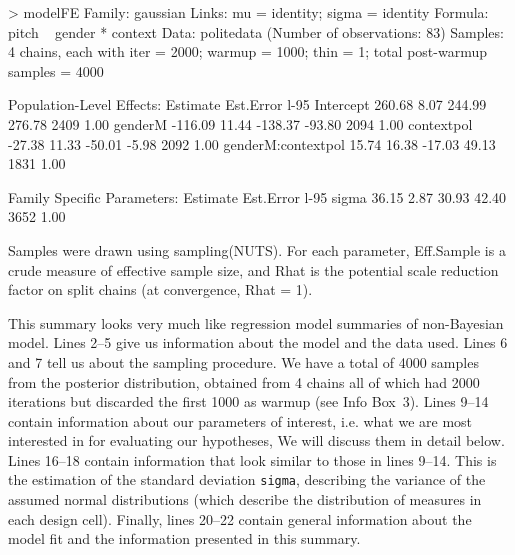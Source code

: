 \documentclass[nobib]{tufte-handout}
\begin{document}
\medskip

\begin{minipage}[]{1.2\textwidth}
\begin{rc}
> modelFE
 Family: gaussian 
  Links: mu = identity; sigma = identity 
Formula: pitch ~ gender * context 
   Data: politedata (Number of observations: 83) 
Samples: 4 chains, each with iter = 2000; warmup = 1000; thin = 1;
         total post-warmup samples = 4000

Population-Level Effects: 
                   Estimate Est.Error l-95%
Intercept            260.68      8.07   244.99   276.78       2409 1.00
genderM             -116.09     11.44  -138.37   -93.80       2094 1.00
contextpol           -27.38     11.33   -50.01    -5.98       2092 1.00
genderM:contextpol    15.74     16.38   -17.03    49.13       1831 1.00

Family Specific Parameters: 
      Estimate Est.Error l-95%
sigma    36.15      2.87    30.93    42.40       3652 1.00

Samples were drawn using sampling(NUTS). For each parameter, Eff.Sample 
is a crude measure of effective sample size, and Rhat is the potential 
scale reduction factor on split chains (at convergence, Rhat = 1).
\end{rc}
\end{minipage}

\medskip

This summary looks very much like regression model summaries of non-Bayesian model. Lines 2--5
give us information about the model and the data used. Lines 6 and 7 tell us about the sampling
procedure. We have a total of 4000 samples from the posterior distribution, obtained from 4
chains all of which had 2000 iterations but discarded the first 1000 as warmup (see Info Box~3). Lines 9--14 contain information about our parameters of interest, i.e. what we are most interested in for evaluating our hypotheses, We will discuss them in detail below. Lines 16--18 contain information that look similar to those in lines 9--14. This is the estimation of the standard deviation \texttt{sigma}, describing the variance of the assumed normal distributions (which describe the distribution of measures in each design cell). Finally, lines 20--22 contain general information about the model fit and the information presented in this summary.
\end{document}
